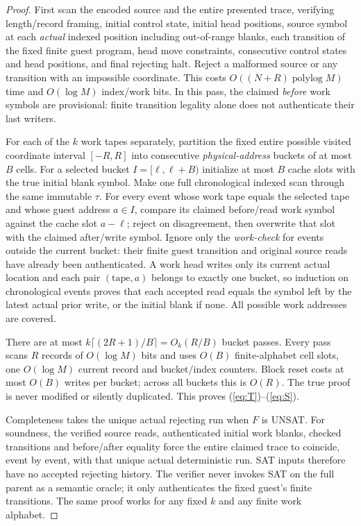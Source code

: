 \documentclass[11pt]{article}
\begin{document}
\begin{proof}
First scan the encoded source and the entire presented trace, verifying length/record framing, initial control state, initial head positions, source symbol at each \emph{actual} indexed position including out-of-range blanks, each transition of the fixed finite guest program, head move constraints, consecutive control states and head positions, and final rejecting halt. Reject a malformed source or any transition with an impossible coordinate. This costs $O((N+R)\operatorname{polylog}M)$ time and $O(\log M)$ index/work bits. In this pass, the claimed \emph{before} work symbols are provisional: finite transition legality alone does not authenticate their last writers.

For each of the $k$ work tapes separately, partition the fixed entire possible visited coordinate interval $[-R,R]$ into consecutive \emph{physical-address} buckets of at most $B$ cells. For a selected bucket $I=[\ell,\ell+B)$ initialize at most $B$ cache slots with the true initial blank symbol. Make one full chronological indexed scan through the same immutable $\tau$. For every event whose work tape equals the selected tape and whose guest address $a\in I$, compare its claimed before/read work symbol against the cache slot $a-\ell$; reject on disagreement, then overwrite that slot with the claimed after/write symbol. Ignore only the \emph{work-check} for events outside the current bucket: their finite guest transition and original source reads have already been authenticated. A work head writes only its current actual location and each pair $(\mathrm{tape},a)$ belongs to exactly one bucket, so induction on chronological events proves that each accepted read equals the symbol left by the latest actual prior write, or the initial blank if none. All possible work addresses are covered.

There are at most $k\lceil(2R+1)/B\rceil=O_k(R/B)$ bucket passes. Every pass scans $R$ records of $O(\log M)$ bits and uses $O(B)$ finite-alphabet cell slots, one $O(\log M)$ current record and bucket/index counters. Block reset costs at most $O(B)$ writes per bucket; across all buckets this is $O(R)$. The true proof is never modified or silently duplicated. This proves (\ref{eq:T})--(\ref{eq:S}).

Completeness takes the unique actual rejecting run when $F$ is UNSAT. For soundness, the verified source reads, authenticated initial work blanks, checked transitions and before/after equality force the entire claimed trace to coincide, event by event, with that unique actual deterministic run. SAT inputs therefore have no accepted rejecting history. The verifier never invokes SAT on the full parent as a semantic oracle; it only authenticates the fixed guest's finite transitions. The same proof works for any fixed $k$ and any finite work alphabet.
\end{proof}
\end{document}
